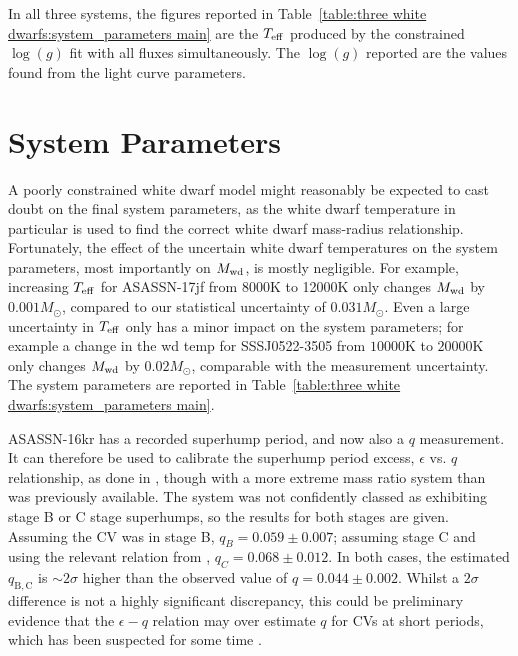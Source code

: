 In all three systems, the figures reported in Table~\ref{table:three white dwarfs:system_parameters main} are the $T_{\rm eff}$ produced by the constrained $\log (g)$ fit with all fluxes simultaneously.
The $\log (g)$ reported are the values found from the light curve parameters.


\section{System Parameters}
\label{sect:system parameters}

A poorly constrained white dwarf model might reasonably be expected to cast doubt on the final system parameters, as the white dwarf temperature in particular is used to find the correct white dwarf mass-radius relationship.
Fortunately, the effect of the uncertain white dwarf temperatures on the system parameters, most importantly on $M_{\rm wd}$, is mostly negligible.
For example, increasing $T_{\rm eff}$ for ASASSN-17jf from 8000K to 12000K only changes $M_{\rm wd}$ by $0.001M_\odot$, compared to our statistical uncertainty of $0.031 M_\odot$. Even a large uncertainty in $T_{\rm eff}$ only has a minor impact on the system parameters; for example a change in the wd temp for SSSJ0522-3505 from $10000$K to $20000$K only changes $M_{\rm wd}$ by $0.02 M_\odot$, comparable with the measurement uncertainty. The system parameters are reported in Table~\ref{table:three white dwarfs:system_parameters main}.

ASASSN-16kr has a recorded superhump period, and now also a $q$ measurement. It can therefore be used to calibrate the superhump period excess, $\epsilon$ vs. $q$ relationship, as done in \citet{McAllister2019}, though with a more extreme mass ratio system than was previously available. The system was not confidently classed as exhibiting stage B or C stage superhumps, so the results for both stages are given. Assuming the CV was in stage B, $q_B = 0.059\pm0.007$; assuming stage C and using the relevant relation from \citet{McAllister2019}, $q_C = 0.068\pm0.012$. In both cases, the estimated $q_\mathrm{B,C}$ is $\sim 2 \sigma$ higher than the observed value of $q = 0.044\pm0.002$. Whilst a $2 \sigma$ difference is not a highly significant discrepancy, this could be preliminary evidence that the $\epsilon - q$ relation may over estimate $q$ for CVs at short periods, which has been suspected for some time \citep{pearson2007, knigge11}.


